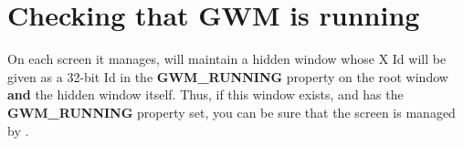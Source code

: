 \section{Checking that GWM is running}

On each screen it manages, {\GWM} will maintain a hidden window whose
X Id will be given as a 32-bit Id in the {\bf GWM\_RUNNING} property
on the root window {\bf and} the hidden window itself. Thus, if this
window exists, and has the {\bf GWM\_RUNNING} property set, you can be
sure that the screen is managed by {\GWM}.
